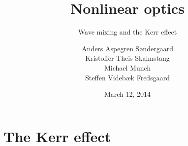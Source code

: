 \documentclass[xcolor=svgnames,smaller]{beamer}
\title{Nonlinear optics}
\subtitle{Wave mixing and the Kerr effect}
\author{
  Anders Aspegren Søndergaard \\
  Kristoffer Theis Skalmstang \\
  Michael Munch \\
  Steffen Videbæk Fredsgaard \\
}
\date{March 12, 2014}
\begin{document}

\frame{\titlepage}



\section{The Kerr effect}



\end{document}
